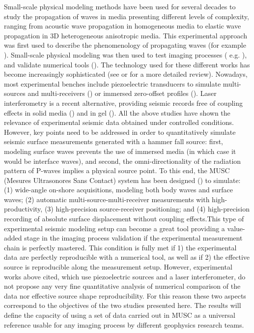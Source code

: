 \documentclass[extra,mreferee]{gji}
\begin{document}
Small-scale physical modeling methods have been used for several decades to study the propagation of waves in media presenting different levels of complexity, ranging from acoustic wave propagation in homogeneous media to elastic wave propagation in 3D heterogeneous anisotropic media. This experimental approach was first used to describe the phenomenology of propagating waves (for example \cite{rieber1936ewp,howes1953sms,oliver1954two,angona1960two,obrien1971model}). Small-scale physical modeling was then used to test imaging processes ( e.g. \cite{hilterman1970tdm,french1974mrp,bishop1985lvm,pratt1999fwi,mo2015development}), and validate numerical tools (\cite{favretto2013nmt}). The technology used for these different works has become increasingly sophisticated  (see \cite{bretaudeau2011ssm}  or \cite{valensi2015multicomponent} for a more detailed review). Nowadays, most experimental benches include piezoelectric transducers to simulate multi-sources and multi-receivers (\cite{wong2009spm}) or immersed zero-offset profiles (\cite{favretto2013nmt}). Laser interferometry is a recent alternative, providing seismic records free of coupling effects in solid media (\cite{bodet2005swi,vanwijk2006eir,bretaudeau2011ssm,bretaudeau2013fwi}) and in gel (\cite{decaqueray2011ewi}). All the above studies have shown the relevance of experimental seismic data obtained under controlled conditions. However, key points need to be addressed in order to quantitatively simulate seismic surface measurements generated with a hammer fall source: first, modeling surface waves prevents the use of immersed media (in which case it would be interface waves), and second, the omni-directionality of the radiation pattern of P-waves implies a physical source point. To this end, the MUSC (Mesures Ultrasonores Sans Contact) system has been designed (\cite{bretaudeau2011ssm}) to simulate: (1) wide-angle on-shore acquisitions, modeling both body waves and surface waves; (2) automatic multi-source-multi-receiver measurements with high-productivity, (3) high-precision source-receiver positioning; and (4) high-precision recording of absolute surface displacement without coupling effects.This type of experimental seismic modeling setup can become a great tool providing a value-added stage in the imaging process validation if the experimental measurement chain is perfectly mastered. This condition is fully met if 1) the experimental data are perfectly reproducible with a numerical tool, as well as if 2) the effective source is reproducible along the measurement setup. However, experimental works above cited, which use piezoelectric sources and a laser interferometer, do not propose any very fine quantitative analysis of numerical comparison of the data nor effective source shape reproducibility. For this reason these two aspects correspond to the objectives of the two studies presented here. The results will define the capacity of using a set of data carried out in MUSC as a universal reference usable for any imaging process by different geophysics research teams.
\end{document}
